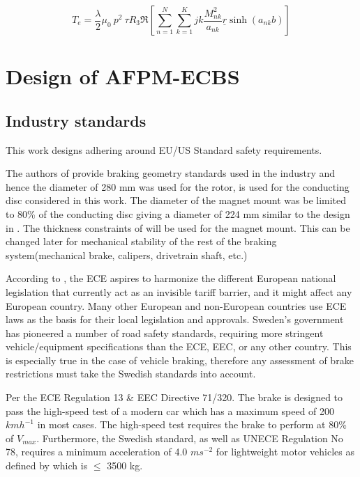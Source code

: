 \documentclass[lettersize,journal]{IEEEtran}
\begin{document}
\begin{equation}
T_e = \frac{\lambda}{2}\mu_0\ p^2\ \tau R_3\mathfrak{R} \left[\sum_{n=1}^{N}\sum_{k=1}^{K} jk\frac{M^2_{nk}}{a_{nk}} \underline{r}\sinh(a_{nk}b) \right]
\end{equation}

\section{Design of AFPM-ECBS}
\subsection{Industry standards}
This work designs adhering around EU/US Standard safety requirements. 

The authors of \cite{li_2011_the} provide braking geometry standards used in the industry and hence the diameter of 280 mm was used for the rotor, is used for the conducting disc considered in this work. The diameter of the magnet mount was be limited to 80\% of the conducting disc giving a diameter of 224 mm similar to the design in \cite{fontchastagner_2018_design}. The thickness constraints of \cite{fontchastagner_2018_design} will be used for the magnet mount. This can be changed later for mechanical stability of the rest of the braking system(mechanical brake, calipers, drivetrain shaft, etc.)

According to \cite{10.2307/44734439}, the ECE aspires to harmonize the different European national legislation that currently act as an invisible tariff barrier, and it might affect any European country. Many other European and non-European countries use ECE laws as the basis for their local legislation and approvals. Sweden's government has pioneered a number of road safety standards, requiring more stringent vehicle/equipment specifications than the ECE, EEC, or any other country. This is especially true in the case of vehicle braking, therefore any assessment of brake restrictions must take the Swedish standards into account.

Per the ECE Regulation 13 & EEC Directive 71/320. The brake is designed to pass the high-speed test of a modern car which has a maximum speed of 200 $kmh^{-1}$ in most cases. The high-speed test requires the brake to perform at 80\% of $V_{max}$. Furthermore, the Swedish standard\cite{10.2307/44734439}, as well as  UNECE Regulation No 78\cite{economiccommissionforeuropeoftheunitednationsunece_2015_regulation}, requires a minimum acceleration of 4.0 $ms^{-2}$ for lightweight motor vehicles as defined by \cite{10.2307/44734439} which is $\leq$ 3500 kg. 
\end{document}
